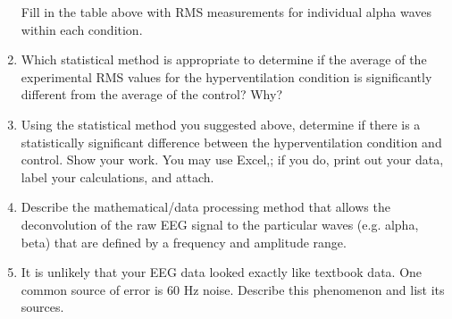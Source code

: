 \documentclass{article}
\begin{document}
\begin{enumerate}
	Fill in the table above with RMS measurements for individual alpha waves within each condition.
	\item Which statistical method is appropriate to determine if the average of the experimental RMS values for the hyperventilation condition is significantly different from the average of the control? Why?
	\item Using the statistical method you suggested above, determine if there is a statistically significant difference between the hyperventilation condition and control. Show your work. You may use Excel,; if you do, print out your data, label your calculations, and attach.
	\item Describe the mathematical/data processing method that allows the deconvolution of the raw EEG signal to the particular waves (e.g. alpha, beta) that are defined by a frequency and amplitude range.
	\item It is unlikely that your EEG data looked exactly like textbook data. One common source of error is 60 Hz noise. Describe this phenomenon and list its sources.
\end{enumerate}
\end{document}
